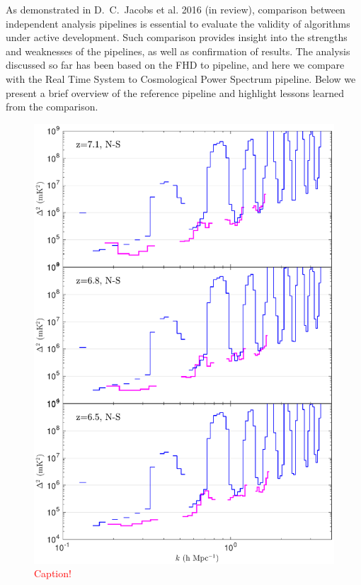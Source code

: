 \documentclass[iop]{emulateapj}
\begin{document}
As demonstrated in D.~C.~Jacobs et al. 2016 (in review), comparison between independent 
analysis pipelines is essential to evaluate the validity of algorithms under active development. 
Such comparison provides insight into the strengths and weaknesses of the pipelines, as well 
as confirmation of results. The analysis discussed so far has been based on the FHD to 
\eppsilon pipeline, and here we compare with the Real Time System \citep[RTS,][]
{Mitchell:2008,Ord:2010} to Cosmological  Power Spectrum \citep[CHIPS,][]
{Trott:2016} pipeline. Below we present a brief overview of the reference pipeline and 
highlight lessons learned from the comparison.


\begin{figure}
\includegraphics[width=\columnwidth]{1D_spectra_comparison.pdf}
\caption{
\textcolor{red}{Caption!}
\label{fig:ps_comparison}
}
\end{figure}
\end{document}
